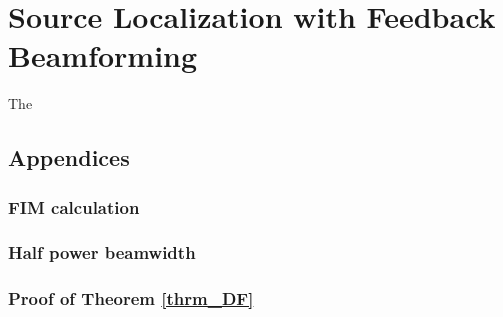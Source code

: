 \chapter{Source Localization with Feedback Beamforming}
\label{chap:firstchap}
The




\section{Appendices}
\subsection{FIM calculation}
\label{apdx_clacFim}

\subsection{Half power beamwidth}
\label{apdx_HPBW}

\subsection{Proof of Theorem \ref{thrm_DF}}
\label{apdx_thrm_DF}
